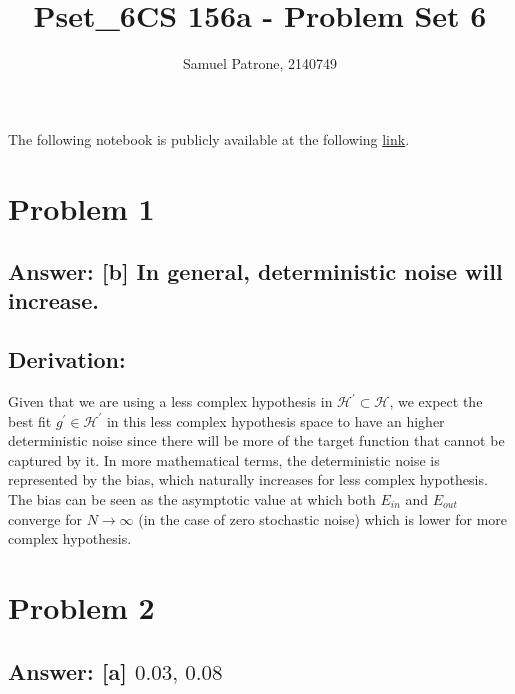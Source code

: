 \documentclass[11pt]{article}
\title{Pset\_6}
\begin{document}
    \title{CS 156a - Problem Set 6}
    \author{Samuel Patrone, 2140749}
    \maketitle
    

The following notebook is publicly available at the following
\href{https://github.com/spatrone/CS156A-Caltech.git}{link}.

\tableofcontents

    \hypertarget{problem-1}{%
\section{Problem 1}\label{problem-1}}

\hypertarget{answer-b-in-general-deterministic-noise-will-increase.}{%
\subsection{Answer: {[}b{]} In general, deterministic noise will
increase.}\label{answer-b-in-general-deterministic-noise-will-increase.}}

\hypertarget{derivation}{%
\subsection{Derivation:}\label{derivation}}

Given that we are using a less complex hypothesis in
\(\mathcal{H}^\prime\subset\mathcal{H}\), we expect the best fit
\(g^\prime\in\mathcal{H}^\prime\) in this less complex hypothesis space
to have an higher deterministic noise since there will be more of the
target function that cannot be captured by it. In more mathematical
terms, the deterministic noise is represented by the bias, which
naturally increases for less complex hypothesis. The bias can be seen as
the asymptotic value at which both \(E_{in}\) and \(E_{out}\) converge
for \(N\to\infty\) (in the case of zero stochastic noise) which is lower
for more complex hypothesis.

    \hypertarget{problem-2}{%
\section{Problem 2}\label{problem-2}}

\hypertarget{answer-a-0.030.08}{%
\subsection{\texorpdfstring{Answer: {[}a{]}
\(0.03,\,0.08\)}{Answer: {[}a{]} 0.03,\textbackslash{},0.08}}\label{answer-a-0.030.08}}
\end{document}

